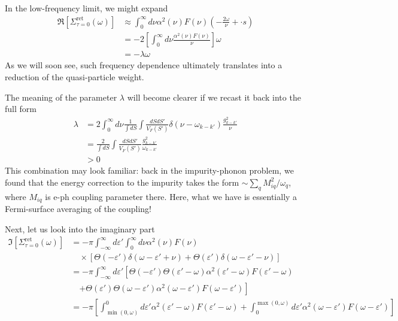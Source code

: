 In the low-frequency limit, we might expand
\begin{align*}
    \Re \left[ \Sigma _{\tau =0}^{\mathrm{ret}}\left( \omega \right) \right] &\approx \int_0^{\infty}{d\nu \alpha ^2\left( \nu \right) F\left( \nu \right) \left( -\frac{2\omega}{\nu}+\cdot s \right)}\\
    &=-2\left[ \int_0^{\infty}{d\nu \frac{\alpha ^2\left( \nu \right) F\left( \nu \right)}{\nu}} \right] \omega \\
    &=-\lambda \omega
\end{align*}
As we will soon see, such frequency dependence ultimately translates into a reduction of the quasi-particle weight.

The meaning of the parameter $\lambda$ will become clearer if we recast it back into the full form
\begin{align*}
    \lambda &=2\int_0^{\infty}{d\nu \frac{1}{\int{dS}}\int{\frac{dSdS'}{V_F\left( S' \right)}\delta \left( \nu -\omega _{k-k'} \right) \frac{g_{k-k'}^{2}}{\nu}}}\\
    &=\frac{2}{\int{dS}}\int{\frac{dSdS'}{V_F\left( S' \right)}\frac{g_{k-k'}^{2}}{\omega _{k-k'}}}\\
    &>0
\end{align*}
This combination may look familiar: back in the impurity-phonon problem, we found that the energy correction to the impurity takes the form $\sim \sum_q{M_{iq}^{2}/\omega _q}$, where $M_{iq}$ is e-ph coupling parameter there. Here, what we have is essentially a Fermi-surface averaging of the coupling!

Next, let us look into the imaginary part
\begin{align*}
    \Im \left[ \Sigma _{\tau =0}^{\mathrm{ret}}\left( \omega \right) \right] &=-\pi \int_{-\infty}^{\infty}{d\varepsilon '\int_0^{\infty}{d\nu \alpha ^2\left( \nu \right) F\left( \nu \right)}}\\
    &\quad \times \left[ \Theta \left( -\varepsilon ' \right) \delta \left( \omega -\varepsilon '+\nu \right) +\Theta \left( \varepsilon ' \right) \delta \left( \omega -\varepsilon '-\nu \right) \right] \\
    &=-\pi \int_{-\infty}^{\infty}{d\varepsilon '\left[ \Theta \left( -\varepsilon ' \right) \Theta \left( \varepsilon '-\omega \right) \alpha ^2\left( \varepsilon '-\omega \right) F\left( \varepsilon '-\omega \right) \right.}\\
    &\quad \left. +\Theta \left( \varepsilon ' \right) \Theta \left( \omega -\varepsilon ' \right) \alpha ^2\left( \omega -\varepsilon ' \right) F\left( \omega -\varepsilon ' \right) \right] \\
    &=-\pi \left[ \int_{\min \left( 0,\omega \right)}^0{d\varepsilon '\alpha ^2\left( \varepsilon '-\omega \right) F\left( \varepsilon '-\omega \right)}+\int_0^{\max \left( 0,\omega \right)}{d\varepsilon '\alpha ^2\left( \omega -\varepsilon ' \right) F\left( \omega -\varepsilon ' \right)} \right]
\end{align*}

